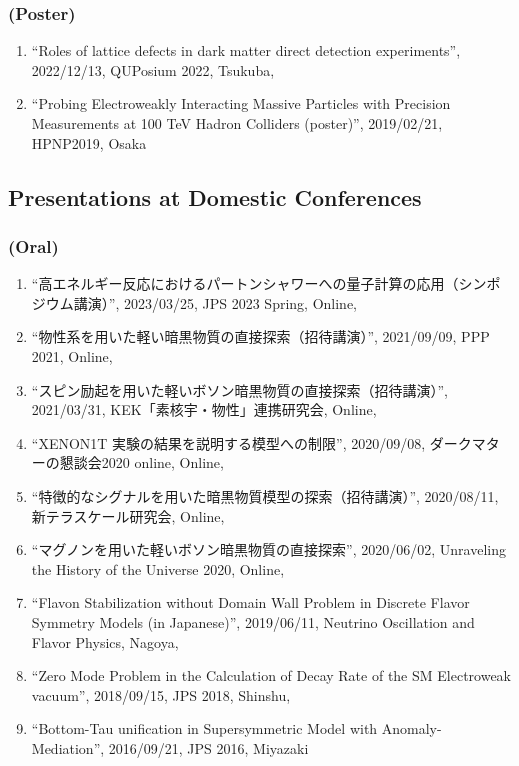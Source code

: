 \documentclass[12pt]{article}
\begin{document}
\subsubsection*{(Poster)}
\begin{enumerate}
 \item ``Roles of lattice defects in dark matter direct detection experiments'', 2022/12/13, QUPosium 2022, Tsukuba,\item ``Probing Electroweakly Interacting Massive Particles with Precision Measurements at 100 TeV Hadron Colliders (poster)'', 2019/02/21, HPNP2019, Osaka
\end{enumerate}

\subsection*{Presentations at Domestic Conferences}
\subsubsection*{(Oral)}
\begin{enumerate}
 \item ``高エネルギー反応におけるパートンシャワーへの量子計算の応用（シンポジウム講演）'', 2023/03/25, JPS 2023 Spring, Online,\item ``物性系を用いた軽い暗黒物質の直接探索（招待講演）'', 2021/09/09, PPP 2021, Online,\item ``スピン励起を用いた軽いボソン暗黒物質の直接探索（招待講演）'', 2021/03/31, KEK「素核宇・物性」連携研究会, Online,\item ``XENON1T 実験の結果を説明する模型への制限'', 2020/09/08, ダークマターの懇談会2020 online, Online,\item ``特徴的なシグナルを用いた暗黒物質模型の探索（招待講演）'', 2020/08/11, 新テラスケール研究会, Online,\item ``マグノンを用いた軽いボソン暗黒物質の直接探索'', 2020/06/02, Unraveling the History of the Universe 2020, Online,\item ``Flavon Stabilization without Domain Wall Problem in Discrete Flavor Symmetry Models (in Japanese)'', 2019/06/11, Neutrino Oscillation and Flavor Physics, Nagoya,\item ``Zero Mode Problem in the Calculation of Decay Rate of the SM Electroweak vacuum'', 2018/09/15, JPS 2018, Shinshu,\item ``Bottom-Tau unification in Supersymmetric Model with Anomaly-Mediation'', 2016/09/21, JPS 2016, Miyazaki
\end{enumerate}
\end{document}
